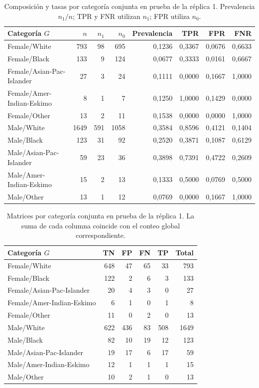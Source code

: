 \documentclass[11pt,a4paper]{article}
\begin{document}
\begin{table}[H]
\centering
\caption[Composición y tasas por categoría conjunta en prueba de la réplica 1.]{Composición y tasas por categoría conjunta en prueba de la réplica 1. Prevalencia $n_1/n$; TPR y FNR utilizan $n_1$; FPR utiliza $n_0$.}\label{tab:grupos1}
\small
\setlength{\tabcolsep}{4pt}
\begin{tabular}{lrrrrrrr}
\toprule
Categoría $G$ & $n$ & $n_1$ & $n_0$ & Prevalencia & TPR & FPR & FNR \\
\midrule
Female/White & 793 & 98 & 695 & 0,1236 & 0,3367 & 0,0676 & 0,6633 \\
Female/Black & 133 & 9 & 124 & 0,0677 & 0,3333 & 0,0161 & 0,6667 \\
Female/Asian-Pac-Islander & 27 & 3 & 24 & 0,1111 & 0,0000 & 0,1667 & 1,0000 \\
Female/Amer-Indian-Eskimo & 8 & 1 & 7 & 0,1250 & 1,0000 & 0,1429 & 0,0000 \\
Female/Other & 13 & 2 & 11 & 0,1538 & 0,0000 & 0,0000 & 1,0000 \\
Male/White & 1649 & 591 & 1058 & 0,3584 & 0,8596 & 0,4121 & 0,1404 \\
Male/Black & 123 & 31 & 92 & 0,2520 & 0,3871 & 0,1087 & 0,6129 \\
Male/Asian-Pac-Islander & 59 & 23 & 36 & 0,3898 & 0,7391 & 0,4722 & 0,2609 \\
Male/Amer-Indian-Eskimo & 15 & 2 & 13 & 0,1333 & 0,5000 & 0,0769 & 0,5000 \\
Male/Other & 13 & 1 & 12 & 0,0769 & 0,0000 & 0,1667 & 1,0000 \\
\bottomrule
\end{tabular}
\end{table}
\begin{table}[H]
\centering
\caption[Matrices por categoría conjunta en prueba de la réplica 1.]{Matrices por categoría conjunta en prueba de la réplica 1. La suma de cada columna coincide con el conteo global correspondiente.}\label{tab:matricesg}
\small
\setlength{\tabcolsep}{4pt}
\begin{tabular}{lrrrrr}
\toprule
Categoría $G$ & TN & FP & FN & TP & Total \\
\midrule
Female/White & 648 & 47 & 65 & 33 & 793 \\
Female/Black & 122 & 2 & 6 & 3 & 133 \\
Female/Asian-Pac-Islander & 20 & 4 & 3 & 0 & 27 \\
Female/Amer-Indian-Eskimo & 6 & 1 & 0 & 1 & 8 \\
Female/Other & 11 & 0 & 2 & 0 & 13 \\
Male/White & 622 & 436 & 83 & 508 & 1649 \\
Male/Black & 82 & 10 & 19 & 12 & 123 \\
Male/Asian-Pac-Islander & 19 & 17 & 6 & 17 & 59 \\
Male/Amer-Indian-Eskimo & 12 & 1 & 1 & 1 & 15 \\
Male/Other & 10 & 2 & 1 & 0 & 13 \\
\bottomrule
\end{tabular}
\end{table}
\end{document}
